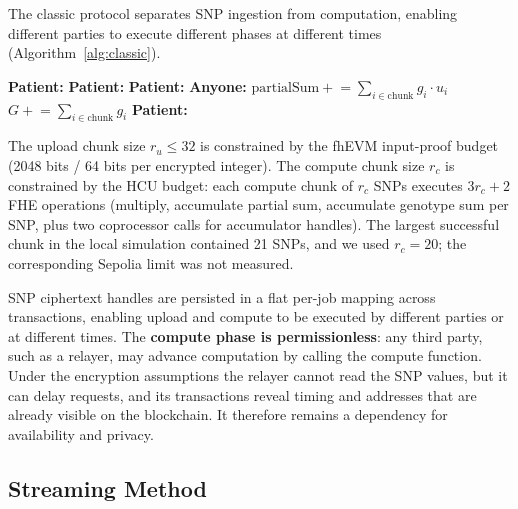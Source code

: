 \documentclass[10pt]{article}
\begin{document}
The classic protocol separates SNP ingestion from computation, enabling different
parties to execute different phases at different times (Algorithm~\ref{alg:classic}).

\begin{algorithm}[t]
\caption{Classic chunked PRS computation (patient and relayer)}
\label{alg:classic}
\small
\begin{algorithmic}[1]
\State \textbf{Patient:} 
  \State \textbf{Patient:} 
\EndFor
\State \textbf{Patient:} 
  \State \textbf{Anyone:} 
  \State \quad $\mathrm{partialSum} \mathrel{+}= \sum_{i \in \mathrm{chunk}} g_i \cdot u_i$
  \State \quad $G \mathrel{+}= \sum_{i \in \mathrm{chunk}} g_i$
\EndFor
\State \textbf{Patient:} 
\end{algorithmic}
\end{algorithm}

The upload chunk size $r_u \leq 32$ is constrained by the fhEVM input-proof budget
(2048 bits / 64 bits per encrypted integer).  The compute chunk size $r_c$ is
constrained by the HCU budget: each compute chunk of $r_c$ SNPs executes
$3r_c + 2$ FHE operations (multiply, accumulate partial sum, accumulate genotype sum
per SNP, plus two coprocessor calls for accumulator handles).  The largest successful
chunk in the local simulation contained 21 SNPs, and we used $r_c = 20$; the
corresponding Sepolia limit was not measured.

SNP ciphertext handles are persisted in a flat per-job mapping across transactions,
enabling upload and compute to be executed by different parties or at different
times.  The \textbf{compute phase is permissionless}: any third party, such as a
relayer, may advance computation by calling the compute function.  Under the encryption
assumptions the relayer cannot read the SNP values, but it can delay requests, and its
transactions reveal timing and addresses that are already visible on the blockchain.  It
therefore remains a dependency for availability and privacy.

\subsection{Streaming Method}
\end{document}

